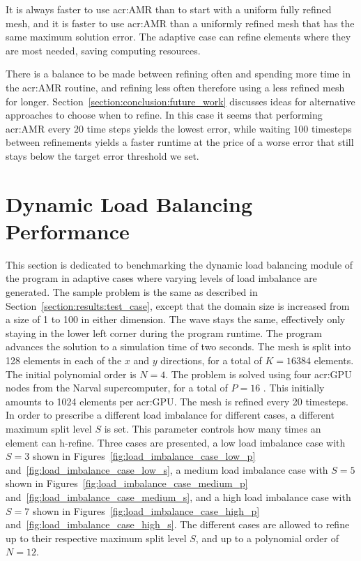 It is always faster to use \acrshort{acr:AMR} than to start with a uniform fully refined mesh, and
it is faster to use \acrshort{acr:AMR} than a uniformly refined mesh that has the same maximum
solution error. The adaptive case can refine elements where they are most needed, saving computing
resources.

There is a balance to be made between refining often and spending more time in the
\acrshort{acr:AMR} routine, and refining less often therefore using a less refined mesh for longer.
Section~\ref{section:conclusion:future_work} discusses ideas for alternative approaches to choose
when to refine. In this case it seems that performing \acrshort{acr:AMR} every \(20\) time steps
yields the lowest error, while waiting \(100\) timesteps between refinements yields a faster runtime
at the price of a worse error that still stays below the target error threshold we set.

\section{Dynamic Load Balancing Performance}\label{section:results:load_balancing_performance}

This section is dedicated to benchmarking the dynamic load balancing module of the program in
adaptive cases where varying levels of load imbalance are generated. The sample problem is the same
as described in Section~\ref{section:results:test_case}, except that the domain size is increased
from a size of 1 to 100 in either dimension. The wave stays the same, effectively only staying in
the lower left corner during the program runtime. The program advances the solution to a simulation
time of two seconds. The mesh is split into 128 elements in each of the \(x\) and \(y\) directions,
for a total of \(K = 16384\) elements. The initial polynomial order is \(N = 4\). The problem is
solved using four \acrshort{acr:GPU} nodes from the Narval supercomputer, for a total of \(P = 16\)
. This initially amounts to 1024 elements per \acrshort{acr:GPU}. The mesh is
refined every 20 timesteps. In order to prescribe a different load imbalance for different cases, a
different maximum split level \(S\) is set. This parameter controls how many times an element can
h-refine. Three cases are presented, a low load imbalance case with \(S = 3\) shown in
Figures~\ref{fig:load_imbalance_case_low_p} and~\ref{fig:load_imbalance_case_low_s}, a medium load
imbalance case with \(S = 5\) shown in Figures~\ref{fig:load_imbalance_case_medium_p}
and~\ref{fig:load_imbalance_case_medium_s}, and a high load imbalance case with \(S = 7\) shown in
Figures~\ref{fig:load_imbalance_case_high_p} and~\ref{fig:load_imbalance_case_high_s}. The different
cases are allowed to refine up to their respective maximum split level \(S\), and up to a polynomial
order of \(N = 12\). 

